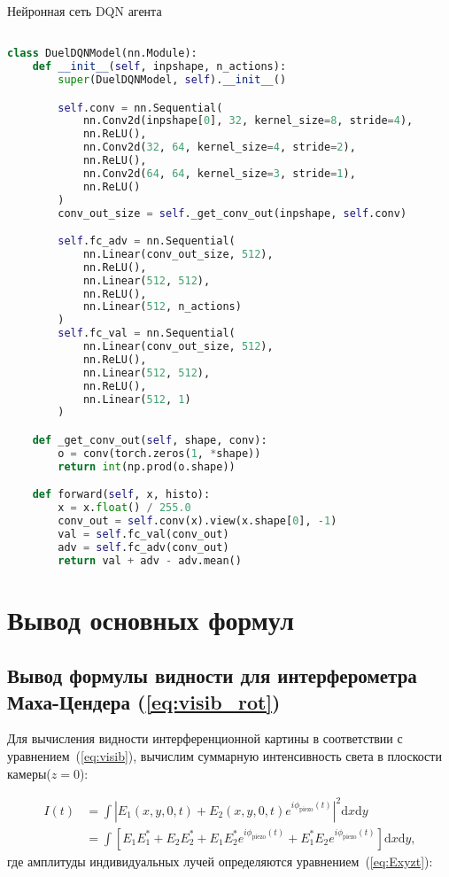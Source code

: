 \begin{ListingEnv}[!h]
\captiondelim{ }
\caption{Нейронная сеть DQN агента}\label{lst:dqn}

\begin{lstlisting}[language=Python]

class DuelDQNModel(nn.Module):
    def __init__(self, inpshape, n_actions):
        super(DuelDQNModel, self).__init__()

        self.conv = nn.Sequential(
            nn.Conv2d(inpshape[0], 32, kernel_size=8, stride=4),
            nn.ReLU(),
            nn.Conv2d(32, 64, kernel_size=4, stride=2),
            nn.ReLU(),
            nn.Conv2d(64, 64, kernel_size=3, stride=1),
            nn.ReLU()
        )
        conv_out_size = self._get_conv_out(inpshape, self.conv)

        self.fc_adv = nn.Sequential(
            nn.Linear(conv_out_size, 512),
            nn.ReLU(),
            nn.Linear(512, 512),
            nn.ReLU(),
            nn.Linear(512, n_actions)
        )
        self.fc_val = nn.Sequential(
            nn.Linear(conv_out_size, 512),
            nn.ReLU(),
            nn.Linear(512, 512),
            nn.ReLU(),
            nn.Linear(512, 1)
        )

    def _get_conv_out(self, shape, conv):
        o = conv(torch.zeros(1, *shape))
        return int(np.prod(o.shape))

    def forward(self, x, histo):
        x = x.float() / 255.0
        conv_out = self.conv(x).view(x.shape[0], -1)
        val = self.fc_val(conv_out)
        adv = self.fc_adv(conv_out)
        return val + adv - adv.mean()
\end{lstlisting}
\end{ListingEnv}


\chapter{Вывод основных формул}\label{app:B}

\section{Вывод формулы видности для интерферометра Маха-Цендера (\ref{eq:visib_rot})}\label{app:B1}

Для вычисления видности интерференционной картины в соответствии с уравнением~(\ref{eq:visib}), вычислим суммарную интенсивность света в плоскости камеры($z=0$):

\begin{align}
    I(t)&=\int |E_1(x,y,0,t)+E_2(x,y,0,t)e^{i\phi_{\mathrm{piezo}}(t)}|^2 {\mathrm{d}}x{\mathrm{d}}y \nonumber \\
    &= \int \left[E_1 E_1 ^* + E_2 E_2^* + E_1 E_2^*e^{i\phi_{\mathrm{piezo}}(t)} + E_1^*E_2e^{i\phi_{\mathrm{piezo}}(t)}\right]{\mathrm{ d}}x{\mathrm{d}}y ,\label{eq:itot}
\end{align}
где амплитуды индивидуальных лучей определяются уравнением~(\ref{eq:Exyzt}):


